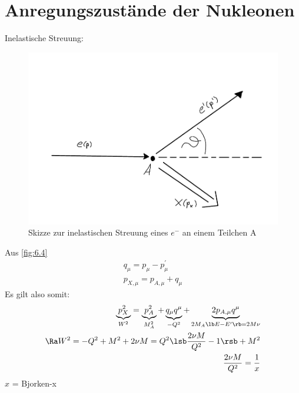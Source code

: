 \section{Anregungszustände der Nukleonen}
Inelastische Streuung:
\begin{figure}[!ht]
\centering
\includegraphics[width=.6\textwidth]{imgs/ep5-fig-6-4.pdf}
\caption{Skizze zur inelastischen Streuung eines $e^-$ an einem Teilchen A\label{fig:6.4}}
\end{figure}
Aus \autoref{fig:6.4}
\begin{align*}
q_\mu = p_\mu - p_\mu^\prime\\
p_{X,\mu} = p_{A,\mu} + q_\mu
\end{align*}
Es gilt also somit:
\begin{align}
\begin{split}
\underbrace{p_X^2}_{W^2} = \underbrace{p_A^2}_{M_A^2} + \underbrace{q_\mu q^\mu}_{-Q^2} + \underbrace{2 p_{A,\mu}q^\mu}_{2M_A\lb E-E^\prime\rb =2 M\nu}\\
\Ra W^2 = -Q^2 + M^2 + 2 \nu M = Q^2 \lsb  \frac{2 \nu M}{Q^2} -1 \rsb  +M^2\\
\frac{2\nu M}{Q^2} = \frac{1}{x}
\end{split}
\end{align}
$x$ = \glqq Bjorken-x\grqq
